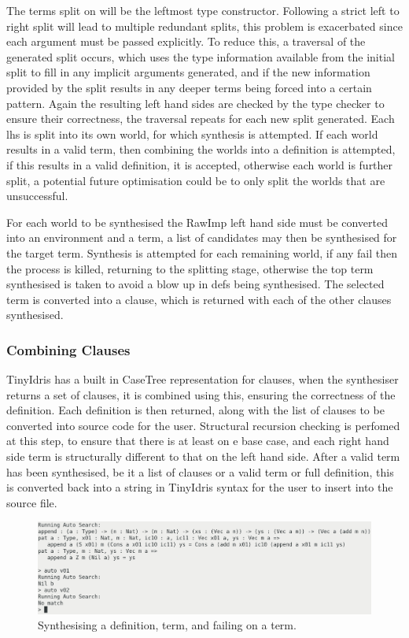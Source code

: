 \documentclass[a4paper]{article}
\begin{document}
The terms split on will be the leftmost type constructor. Following a strict 
left to right split will lead to multiple redundant splits, this problem is 
exacerbated since each argument must be passed explicitly. To reduce this, 
a traversal of the generated split occurs, which uses the type information 
available from the initial split to fill in any implicit arguments generated, 
and if the new information provided by the split results in any deeper terms 
being forced into a certain pattern. Again the resulting left hand sides are
checked by the type checker to ensure their correctness, the traversal repeats for
each new split generated. Each lhs is split
into its own world, for which synthesis is attempted. If each world results 
in a valid term, then combining the worlds into a definition is attempted, if this
results in a valid definition, it is accepted, otherwise each world is further
split, a potential future optimisation could be to only split the worlds that are 
unsuccessful.

For each world to be synthesised the RawImp left hand side must be 
converted into an environment and a term, a list of candidates may then be 
synthesised for the target term. Synthesis is attempted for each remaining world, 
if any fail then the process is killed, returning to the splitting stage, otherwise the top term synthesised
is taken to avoid a blow up in defs being synthesised. The selected term is
converted into a clause, which is returned with each of the other clauses synthesised. 

\subsubsection{Combining Clauses}
\label{sec:org909acde}
TinyIdris has a built in CaseTree representation for clauses, when the synthesiser
returns a set of clauses, it is combined using this, ensuring the correctness
of the definition. Each definition is then returned, along with the list of clauses
to be converted into source code for the user. Structural recursion
checking is perfomed at this step, to ensure that there is at least on e base case, and each right hand side term is structurally different 
to that on the left hand side. 
After a valid term has been synthesised, be it a list of clauses or a valid term or 
full definition, this is converted back into a string in TinyIdris syntax for
the user to insert into the source file. 

\begin{center}
\begin{figure}[htbp]
\centering
\includegraphics[scale=0.25]{./Resource/running.png}
\caption{Synthesising a definition, term, and failing on a term.}
\end{figure}
\end{center}
\end{document}
